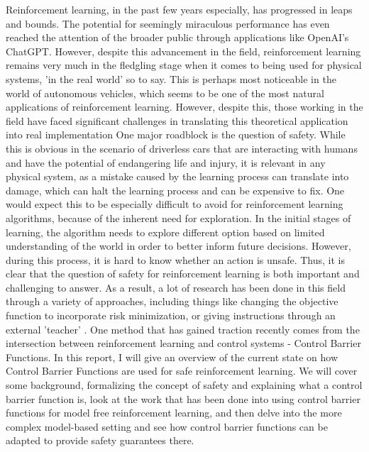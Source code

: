 \documentclass{article}
\begin{document}
Reinforcement learning, in the past few years especially, has progressed in leaps and bounds. The potential for seemingly miraculous performance has even reached the attention of the broader public through applications like OpenAI's ChatGPT. However, despite this advancement in the field, reinforcement learning remains very much in the fledgling stage when it comes to being used for physical systems, 'in the real world' so to say. This is perhaps most noticeable in the world of autonomous vehicles, which seems to be one of the most natural applications of reinforcement learning. However, despite this, those working in the field have faced significant challenges in translating this theoretical application into real implementation \cite{kiran2021deep} One major roadblock is the question of safety. While this is obvious in the scenario of driverless cars that are interacting with humans and have the potential of endangering life and injury, it is relevant in any physical system, as a mistake caused by the learning process can translate into damage, which can halt the learning process and can be expensive to fix. One would expect this to be especially difficult to avoid for reinforcement learning algorithms, because of the inherent need for exploration. In the initial stages of learning, the algorithm needs to explore different option based on limited understanding of the world in order to better inform future decisions. However, during this process, it is hard to know whether an action is unsafe. Thus, it is clear that the question of safety for reinforcement learning is both important and challenging to answer. As a result, a lot of research has been done in this field through a variety of approaches, including things like changing the objective function to incorporate risk minimization, or giving instructions through an external 'teacher' \cite{garcia2015comprehensive}. One method that has gained traction recently comes from the intersection between reinforcement learning and control systems - Control Barrier Functions. In this report, I will give an overview of the current state on how Control Barrier Functions are used for safe reinforcement learning. We will cover some background, formalizing the concept of safety and explaining what a control barrier function is, look at the work that has been done into using control barrier functions for model free reinforcement learning, and then delve into the more complex model-based setting and see how control barrier functions can be adapted to provide safety guarantees there.
\newpage
\end{document}
